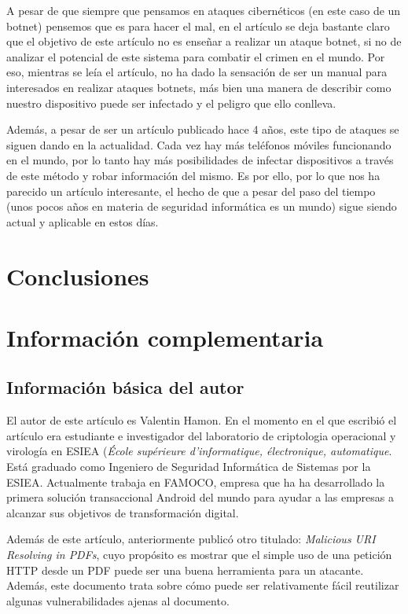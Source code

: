 \documentclass[a4paper,11pt]{report}
\begin{document}
A pesar de que siempre que pensamos en ataques cibernéticos (en este caso de un botnet) pensemos que es para hacer el mal, en el artículo se deja bastante claro que el objetivo de este artículo no es enseñar a realizar un ataque botnet, si no de analizar el potencial de este sistema para combatir el crimen en el mundo. Por eso, mientras se leía el artículo, no ha dado la sensación de ser un manual para interesados en realizar ataques botnets, más bien una manera de describir como nuestro dispositivo puede ser infectado y el peligro que ello conlleva.

Además, a pesar de ser un artículo publicado hace 4 años, este tipo de ataques se siguen dando en la actualidad. Cada vez hay más teléfonos móviles funcionando en el mundo, por lo tanto hay más posibilidades de infectar dispositivos a través de este método y robar información del mismo. Es por ello, por lo que nos ha parecido un artículo interesante, el hecho de que a pesar del paso del tiempo (unos pocos años en materia de seguridad informática es un mundo) sigue siendo actual y aplicable en estos días.


\chapter{Conclusiones} \label{conclusiones}






\chapter{Información complementaria}
\section{Información básica del autor}\label{autor}
El autor de este artículo es Valentin Hamon\cite{Autor}. En el momento en el que escribió el artículo era estudiante e investigador del laboratorio de criptologia operacional y virología en ESIEA\cite{ESIEA} (\emph{École supérieure d'informatique, électronique, automatique}. Está graduado como Ingeniero de Seguridad Informática de Sistemas por la ESIEA. Actualmente trabaja en FAMOCO, empresa que ha ha desarrollado la primera solución transaccional Android del mundo para ayudar a las empresas a alcanzar sus objetivos de transformación digital.

Además de este artículo, anteriormente publicó otro titulado: \emph{Malicious URI Resolving in PDFs}, cuyo propósito es mostrar que el simple uso de una petición HTTP desde un PDF puede ser una buena herramienta  para un atacante. Además, este documento trata sobre cómo puede ser relativamente fácil reutilizar algunas vulnerabilidades ajenas al documento. 
\end{document}
